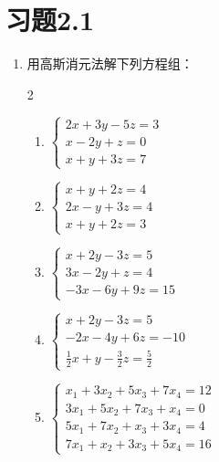 \section*{习题2.1}

\begin{enumerate}
    \item 用高斯消元法解下列方程组：
\begin{multicols}{2}
\begin{enumerate}
    \item $\begin{cases}
        2x+3y-5z=3\\x-2y+z=0\\x+y+3z=7
    \end{cases}$
    \item $\begin{cases}
        x+y+2z=4\\2x-y+3z=4\\x+y+2z=3
    \end{cases}$
    \item $\begin{cases}
         x+2y-3z=5\\3x-2y+z=4\\-3x-6y+9z=15
    \end{cases}$
    \item $\begin{cases}
         x+2y-3z=5\\ -2x-4y+6z=-10\\ \frac{1}{2}x+y-\frac{3}{2}z=\frac{5}{2}
    \end{cases}$
    \item $\begin{cases}
        x_1+3x_2+5x_3+7x_4=12\\ 3x_1+5x_2+7x_3+x_4 =0\\
    5x_1+7x_2+x_3+3x_4=4\\ 7x_1+x_2+3x_3+5x_4=16
    \end{cases}$
    
\end{enumerate}    
\end{multicols}


\end{enumerate}
